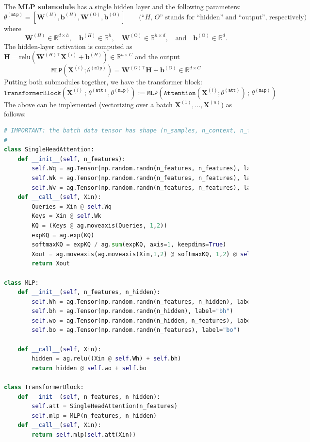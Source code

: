 \documentclass{article}
\newcommand{\bfX}{\mathbf{X}}
\newcommand{\bfb}{\mathbf{b}}
\newcommand{\bfW}{\mathbf{W}}
\begin{document}
\vspace{1em}




The \textbf{MLP submodule} has a single hidden layer and the following parameters:
\[
\theta^{(\texttt{mlp})} = [\bfW^{(H)}, \bfb^{(H)}, \bfW^{(\text{O})}, \bfb^{(\text{O})}]
\qquad
\mbox{
  (``\(H\), \(O\)''
  stands for ``hidden'' and ``output'', respectively)
}
\]
where
\[
\bfW^{(H)} \in \mathbb{R}^{d \times h}, \quad \bfb^{(H)} \in \mathbb{R}^{h}, \quad \bfW^{(\text{O})} \in \mathbb{R}^{h \times d}, \quad \text{and} \quad \bfb^{(\text{O})} \in \mathbb{R}^d.
\]
The hidden-layer activation is computed as
   \(     \mathbf{H} = \mathrm{relu}\left(\bfW^{(H)\top}\bfX^{(i)}
      + \bfb^{(H)}\right) \in \mathbb{R}^{h \times C}
\) and the output
   \[
     \mathtt{MLP}(\bfX^{(i)}; \theta^{(\texttt{mlp})})
     =
     \bfW^{(O)\top} \mathbf{H} + \bfb^{(O)}
     \in \mathbb{R}^{d \times C}
   \]
   Putting both submodules together,  we have the transformer block:
\[
\texttt{TransformerBlock}(\bfX^{(i)} \, ; \, \theta^{(\mathtt{att})}, \theta^{(\mathtt{mlp})}) := \texttt{MLP}(\texttt{Attention}(\bfX^{(i)}; \theta^{(\texttt{att})}) \, ; \, \theta^{(\texttt{mlp})})
\]
The above can be implemented (vectorizing over a batch \(\bfX^{(1)},\dots, \bfX^{(n)}\)) as follows:




\begin{lstlisting}[language=Python]
# IMPORTANT: the batch data tensor has shape (n_samples, n_context, n_features)
#
class SingleHeadAttention:
    def __init__(self, n_features):
        self.Wq = ag.Tensor(np.random.randn(n_features, n_features), label="Wq")
        self.Wk = ag.Tensor(np.random.randn(n_features, n_features), label="Wk")
        self.Wv = ag.Tensor(np.random.randn(n_features, n_features), label="Wv")
    def __call__(self, Xin):
        Queries = Xin @ self.Wq
        Keys = Xin @ self.Wk
        KQ = (Keys @ ag.moveaxis(Queries, 1,2))
        expKQ = ag.exp(KQ)
        softmaxKQ = expKQ / ag.sum(expKQ, axis=1, keepdims=True)
        Xout = ag.moveaxis(ag.moveaxis(Xin,1,2) @ softmaxKQ, 1,2) @ self.Wv
        return Xout

class MLP:
    def __init__(self, n_features, n_hidden):
        self.Wh = ag.Tensor(np.random.randn(n_features, n_hidden), label="Wh")
        self.bh = ag.Tensor(np.random.randn(n_hidden), label="bh")
        self.wo = ag.Tensor(np.random.randn(n_hidden, n_features), label="Wo")
        self.bo = ag.Tensor(np.random.randn(n_features), label="bo")

    def __call__(self, Xin):
        hidden = ag.relu((Xin @ self.Wh) + self.bh)
        return hidden @ self.wo + self.bo

class TransformerBlock:
    def __init__(self, n_features, n_hidden):
        self.att = SingleHeadAttention(n_features)
        self.mlp = MLP(n_features, n_hidden)
    def __call__(self, Xin):
        return self.mlp(self.att(Xin))
\end{lstlisting}
\end{document}
